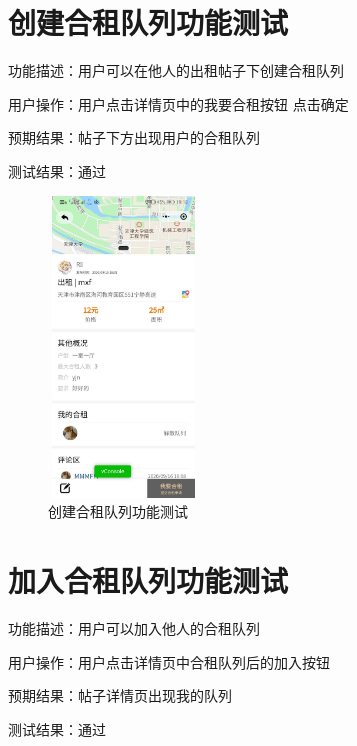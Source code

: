    \section{创建合租队列功能测试}
 
   功能描述：用户可以在他人的出租帖子下创建合租队列
   
   用户操作：用户点击详情页中的我要合租按钮 点击确定
   
   预期结果：帖子下方出现用户的合租队列
   
   测试结果：通过
   \newpage 
   \begin{figure}[htbp]
       \centering
       \begin{minipage}[t]{0.48\textwidth}
       \centering
       \includegraphics[width=4cm,height=8cm]{test/image/test40.png} 
    
      \caption{创建合租队列功能测试} 
       \end{minipage}
        
       \end{figure}
 

   \section{加入合租队列功能测试}
   功能描述：用户可以加入他人的合租队列
   
   用户操作：用户点击详情页中合租队列后的加入按钮
   
   预期结果：帖子详情页出现我的队列
   
   测试结果：通过
   
